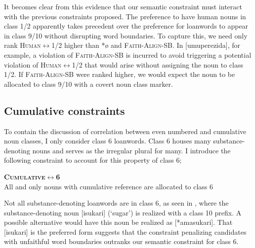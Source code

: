\documentclass[output=paper,colorlinks,citecolor=brown,
]{langscibook}
\begin{document}
It becomes clear from this evidence that our semantic constraint must interact with the previous constraints proposed. The preference to have human nouns in class 1/2 apparently takes precedent over the preference for loanwords to appear in class 9/10 without disrupting word boundaries. To capture this, we need only rank \textsc{Human{$\leftrightarrow$}{1/2}} higher than *ø and \textsc{Faith-Align-SB}. In [umuperezida], for example, a violation of \textsc{Faith-Align-SB} is incurred to avoid triggering a potential violation of \textsc{Human{$\leftrightarrow$}{1/2}} that would arise without assigning the noun to class 1/2. If \textsc{Faith-Align-SB} were ranked higher, we would expect the noun to be allocated to class 9/10 with a covert noun class marker. 

\begin{table}
\ShadingOn
  \caption{Evaluation of /prezidə/}
  \label{tab:kinchsular:presidenttableau2}
\end{table}

\subsection{Cumulative constraints} \label{sec:kinchsular:cumulativeconstraints}

 To contain the discussion of correlation between even numbered and cumulative noun classes, I only consider class 6 loanwords. Class 6 houses many substance-denoting nouns and serves as the irregular plural for many. I introduce the following constraint to account for this property of class 6;

\begin{exe}
    \ex \textbf{C\textsc{umulative{$\leftrightarrow$}{6}}}\\ All and only nouns with cumulative reference are allocated to class 6
\end{exe} 

Not all substance-denoting loanwords are in class 6, as seen in , where the substance-denoting noun [isukari] (‘sugar’) is realized with a class 10 prefix. A possible alternative would have this noun be realized as [*amasukari]. That [isukari] is the preferred form suggests that the constraint penalizing candidates with unfaithful word boundaries outranks our semantic constraint for class 6. 
\end{document}
